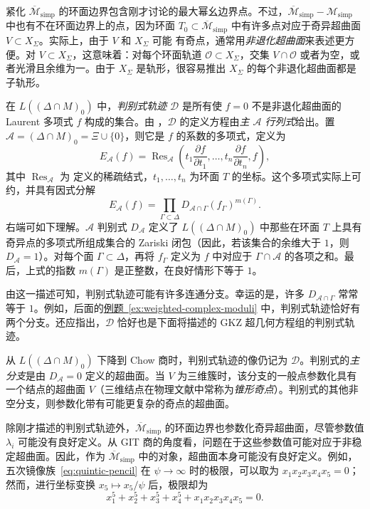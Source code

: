 紧化 $\overline{\mathcal M}_{\mathrm{simp}}$ 的环面边界包含刚才讨论的最大幂幺边界点。不过，$\overline{\mathcal M}_{\mathrm{simp}}-\mathcal M_{\mathrm{simp}}$ 中也有不在环面边界上的点，因为环面 $T_0\subset\overline{\mathcal M}_{\mathrm{simp}}$ 中有许多点对应于奇异超曲面 $V\subset X_\Sigma$。实际上，由于 $V$ 和 $X_\Sigma$ 可能
有奇点，通常用\emph{非退化超曲面}来表述更方便。对 $V\subset X_\Sigma$，这意味着：对每个环面轨道 $\mathcal O\subset X_\Sigma$，交集 $V\cap\mathcal O$ 或者为空，或者光滑且余维为一。由于 $X_\Sigma$ 是轨形，很容易推出 $X_\Sigma$ 的每个非退化超曲面都是子轨形。

在 $L((\Delta\cap M)_0)$ 中，\emph{判别式轨迹} $\mathcal D$ 是所有使 $f=0$ 不是非退化超曲面的 Laurent 多项式 $f$ 构成的集合。由 ，$\mathcal D$ 的定义方程由\emph{主 $\mathcal A$ 行列式}给出。置 $\mathcal A=(\Delta\cap M)_0=\Xi\cup\{0\}$，则它是 $f$ 的系数的多项式，定义为
\[
E_{\mathcal A}(f)=\operatorname{Res}_{\mathcal A}
\left(t_1\frac{\partial f}{\partial t_1},\ldots,t_n\frac{\partial f}{\partial t_n},f\right),
\]
其中 $\operatorname{Res}_{\mathcal A}$ 为  定义的稀疏结式，$t_1,\ldots,t_n$ 为环面 $T$ 的坐标。这个多项式实际上可约，并具有因式分解
\[
E_{\mathcal A}(f)=\prod_{\Gamma\subset\Delta}
D_{\mathcal A\cap\Gamma}(f_\Gamma)^{m(\Gamma)}.
\]
右端可如下理解。$\mathcal A$ 判别式 $D_{\mathcal A}$ 定义了 $L((\Delta\cap M)_0)$ 中那些在环面 $T$ 上具有奇异点的多项式所组成集合的 Zariski 闭包（因此，若该集合的余维大于 $1$，则 $D_{\mathcal A}=1$）。对每个面 $\Gamma\subset\Delta$，再将 $f_\Gamma$ 定义为 $f$ 中对应于 $\Gamma\cap\mathcal A$ 的各项之和。最后，上式的指数 $m(\Gamma)$ 是正整数，在良好情形下等于 $1$。

由这一描述可知，判别式轨迹可能有许多连通分支。幸运的是，许多 $D_{\mathcal A\cap\Gamma}$ 常常等于 $1$。例如，后面的\hyperref[ex:weighted-complex-moduli]{例题~\ref*{ex:weighted-complex-moduli}} 中，判别式轨迹恰好有两个分支。还应指出，$\mathcal D$ 恰好也是下面将描述的 GKZ 超几何方程组的判别式轨迹。

从 $L((\Delta\cap M)_0)$ 下降到 Chow 商时，判别式轨迹的像仍记为 $\mathcal D$。判别式的\emph{主分支}是由 $D_{\mathcal A}=0$ 定义的超曲面。当 $V$ 为三维簇时，该分支的一般点参数化具有一个结点的超曲面 $V$（三维结点在物理文献中常称为\emph{锥形奇点}）。判别式的其他非空分支，则参数化带有可能更复杂的奇点的超曲面。

除刚才描述的判别式轨迹外，$\overline{\mathcal M}_{\mathrm{simp}}$ 的环面边界也参数化奇异超曲面，尽管参数值 $\lambda_i$ 可能没有良好定义。从 GIT 商的角度看，问题在于这些参数值可能对应于非稳定超曲面。因此，作为 $\overline{\mathcal M}_{\mathrm{simp}}$ 中的对象，超曲面本身可能没有良好定义。例如，五次镜像族~\eqref{eq:quintic-pencil} 在 $\psi\to\infty$ 时的极限，可以取为 $x_1x_2x_3x_4x_5=0$；然而，进行坐标变换 $x_5\mapsto x_5/\psi$ 后，极限却为
\[
x_1^5+x_2^5+x_3^5+x_4^5+x_1x_2x_3x_4x_5=0.
\]

